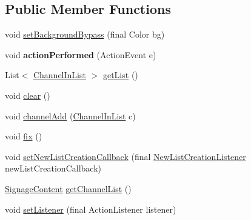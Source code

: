 \subsection*{Public Member Functions}
\begin{DoxyCompactItemize}
\item 
void \hyperlink{classgov_1_1fnal_1_1ppd_1_1dd_1_1channel_1_1list_1_1ChannelListGUI_a0248f91962f51286514741ca3ae22be5}{set\-Background\-Bypass} (final Color bg)
\item 
\hypertarget{classgov_1_1fnal_1_1ppd_1_1dd_1_1channel_1_1list_1_1ChannelListGUI_a12130d6b9b424cbf7c04999edd338e91}{void {\bfseries action\-Performed} (Action\-Event e)}\label{classgov_1_1fnal_1_1ppd_1_1dd_1_1channel_1_1list_1_1ChannelListGUI_a12130d6b9b424cbf7c04999edd338e91}

\item 
List$<$ \hyperlink{classgov_1_1fnal_1_1ppd_1_1dd_1_1channel_1_1ChannelInList}{Channel\-In\-List} $>$ \hyperlink{classgov_1_1fnal_1_1ppd_1_1dd_1_1channel_1_1list_1_1ChannelListGUI_a3f5795ae59811730376ca998cca2df38}{get\-List} ()
\item 
void \hyperlink{classgov_1_1fnal_1_1ppd_1_1dd_1_1channel_1_1list_1_1ChannelListGUI_a49d5de5df273113318fc59de3d298967}{clear} ()
\item 
void \hyperlink{classgov_1_1fnal_1_1ppd_1_1dd_1_1channel_1_1list_1_1ChannelListGUI_aac2bcf918b3c9685681739a3dcbdf9c4}{channel\-Add} (\hyperlink{classgov_1_1fnal_1_1ppd_1_1dd_1_1channel_1_1ChannelInList}{Channel\-In\-List} c)
\item 
void \hyperlink{classgov_1_1fnal_1_1ppd_1_1dd_1_1channel_1_1list_1_1ChannelListGUI_a8baf2ca96aea0b400f39ce50297f191b}{fix} ()
\item 
void \hyperlink{classgov_1_1fnal_1_1ppd_1_1dd_1_1channel_1_1list_1_1ChannelListGUI_aab16046287399636afa75b7d299c2048}{set\-New\-List\-Creation\-Callback} (final \hyperlink{interfacegov_1_1fnal_1_1ppd_1_1dd_1_1channel_1_1list_1_1NewListCreationListener}{New\-List\-Creation\-Listener} new\-List\-Creation\-Callback)
\item 
\hyperlink{interfacegov_1_1fnal_1_1ppd_1_1dd_1_1signage_1_1SignageContent}{Signage\-Content} \hyperlink{classgov_1_1fnal_1_1ppd_1_1dd_1_1channel_1_1list_1_1ChannelListGUI_aec3f27a75e070f286225a7e8e69aeca1}{get\-Channel\-List} ()
\item 
void \hyperlink{classgov_1_1fnal_1_1ppd_1_1dd_1_1channel_1_1list_1_1ChannelListGUI_ac4fca92d4bc81f9ed0ba0c53b31a07e7}{set\-Listener} (final Action\-Listener listener)
\end{DoxyCompactItemize}
